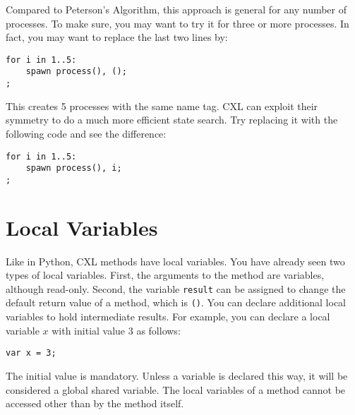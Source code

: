 \documentclass{report}
\newenvironment{code}{
\tcolorbox
}{
\endtcolorbox
}
\begin{document}
Compared to Peterson's Algorithm, this approach is general for
any number of processes.  To make sure, you may want to try it
for three or more processes.  In fact, you may want to replace
the last two lines by:
\begin{code}
\begin{verbatim}
for i in 1..5:
    spawn process(), ();
;
\end{verbatim}
\end{code}
This creates 5 processes with the same name tag.  CXL can
exploit their symmetry to do a much more efficient state
search.  Try replacing it with the following code and see
the difference:
\begin{code}
\begin{verbatim}
for i in 1..5:
    spawn process(), i;
;
\end{verbatim}
\end{code}

\chapter{Local Variables}

Like in Python, CXL methods have local variables.  You have already
seen two types of local variables.
First, the arguments to the method are variables, although read-only.
Second, the variable \texttt{result} can be assigned to
change the default return value of a method, which is \texttt{()}.
You can declare additional local variables to hold intermediate
results.  For example, you can
declare a local variable $x$ with initial value 3 as follows:
\begin{code}
\begin{verbatim}
var x = 3;
\end{verbatim}
\end{code}
The initial value is mandatory.
Unless a variable is declared this way, it will be considered
a global shared variable.
The local variables of a method cannot be accessed other than by
the method itself.
\end{document}
